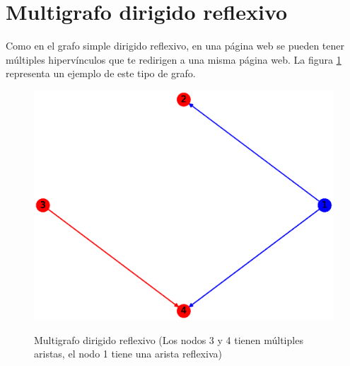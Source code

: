 \documentclass{article}
\begin{document}
\section{Multigrafo dirigido reflexivo}
Como en el grafo simple dirigido reflexivo, en una página web se pueden tener múltiples hipervínculos que te redirigen a una misma página web. La figura \ref{fig:MDR} representa un ejemplo de este tipo de grafo.
\begin{figure}[h!]
    \caption{Multigrafo dirigido reflexivo (Los nodos 3 y 4 tienen múltiples aristas, el nodo 1 tiene una arista reflexiva)}
    \includegraphics[width=\textwidth]{12-MDR}
    \label{fig:MDR}
\end{figure}









\end{document}
